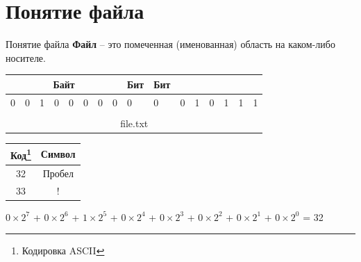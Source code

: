 \documentclass[12pt]{beamer}
\begin{document}
\section{Понятие файла}
\begin{frame}{Понятие файла}
\textbf{Файл} -- это помеченная (именованная) область на каком-либо носителе. \\
\vspace{0.5cm}

\begin{tabular}{|p{0.3cm}|p{0.3cm}|p{0.3cm}|p{0.3cm}|p{0.3cm}|p{0.3cm}|p{0.3cm}|p{0.3cm}|p{0.55cm}|p{0.55cm}|p{0.3cm}|p{0.3cm}|p{0.3cm}|p{0.3cm}|p{0.3cm}|p{0.3cm}|}
\hline 
\multicolumn{8}{|c|}{Байт} & Бит & Бит &  &  &  &  &  &  \\ 
\hline 
0 & 0 & 1 & 0 & 0 & 0 & 0 & 0 & 0 & 0 & 0 & 1 & 0 & 1 & 1 & 1 \\ 
\hline 
\multicolumn{16}{c}{} \\ 
\multicolumn{16}{|c|}{file.txt} \\ 
\hline 
\end{tabular} 
\par
\vspace{0.3cm}
\begin{tabular}{|c|c|}
\hline 
Код\footnote{Кодировка ASCII} & Символ \\ 
\hline 
32 & Пробел \\ 
\hline 
33 & ! \\ 
\hline 
\end{tabular}  
\par 
\vspace{0.3cm}
$0\times2^7$ + $0\times2^6$ + $1\times2^5$ + $0\times2^4$ + $0\times2^3$ + $0\times2^2$ + $0\times2^1$ + $0\times2^0$ = 32 \\
\end{frame}
\end{document}
